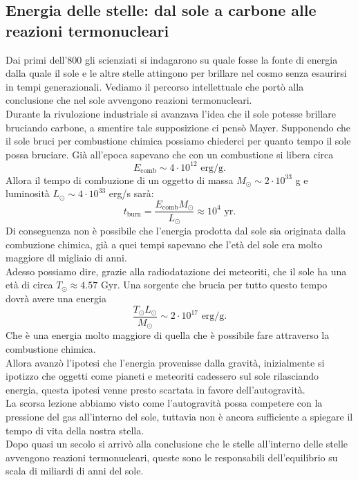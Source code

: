 \subsection{Energia delle stelle: dal sole a carbone alle reazioni termonucleari}
\label{subsec:Energia delle stelle: dal sole a carbone alle reazioni termonucleari}
Dai primi dell'800 gli scienziati si indagarono su quale fosse la fonte di energia dalla quale il sole e le altre stelle attingono per brillare nel cosmo senza esaurirsi in tempi generazionali. Vediamo il percorso intellettuale che portò alla conclusione che nel sole avvengono reazioni termonucleari.\\
Durante la rivulozione industriale si avanzava l'idea che il sole potesse brillare bruciando carbone, a smentire tale supposizione ci pensò Mayer. Supponendo che il sole bruci per combustione chimica possiamo chiederci per quanto tempo il sole possa bruciare. Già all'epoca sapevano che con un combustione si libera circa
\[
	E_\text{comb} \sim 4 \cdot 10^{12} \text{ erg/g}
.\] 
Allora il tempo di combuzione di un oggetto di massa $M_{\odot} \sim 2 \cdot 10^{33} $ g e luminosità $L_{\odot} \sim 4 \cdot 10^{33} $ erg/s sarà:
\[
	t_\text{burn} = \frac{E_\text{comb} M_{\odot}}{L_{\odot}} \approx 10^{4} \text{ yr} 
.\] 
Di conseguenza non è possibile che l'energia prodotta dal sole sia originata dalla combuzione chimica, già a quei tempi sapevano che l'età del sole era molto maggiore dl migliaio di anni.\\
Adesso possiamo dire, grazie alla radiodatazione dei meteoriti, che il sole ha una età di circa $T_{\odot} \approx 4.57 $ Gyr. Una sorgente che brucia per tutto questo tempo dovrà avere una energia
\[
	\frac{T_{\odot}L_{\odot}}{M_{\odot}} \sim 2 \cdot 10^{17} \text{ erg/g}
.\] 
Che è una energia molto maggiore di quella che è possibile fare attraverso la combustione chimica.\\
Allora avanzò l'ipotesi che l'energia provenisse dalla gravità, inizialmente si ipotizzo che oggetti come pianeti e meteoriti cadessero sul sole rilasciando energia, questa ipotesi venne presto scartata in favore dell'autogravità.\\
La scorsa lezione abbiamo visto come l'autogravità possa competere con la pressione del gas all'interno del sole, tuttavia non è ancora sufficiente a spiegare il tempo di vita della nostra stella. \\
Dopo quasi un secolo si arrivò alla conclusione che le stelle all'interno delle stelle avvengono reazioni termonucleari, queste sono le responsabili dell'equilibrio su scala di miliardi di anni del sole.
